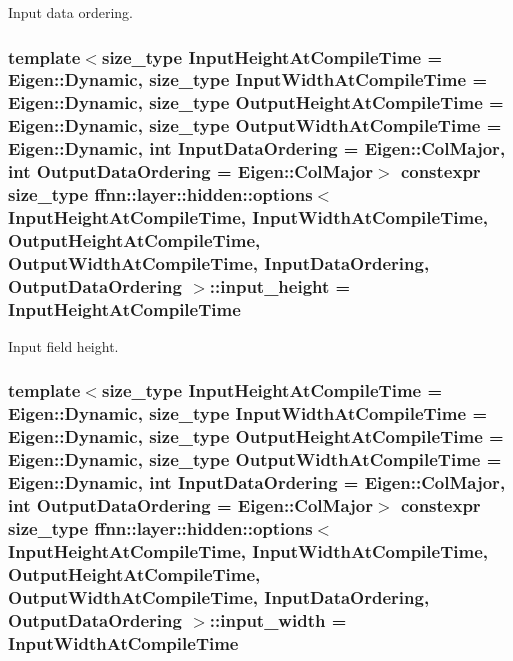 Input data ordering. 

\hypertarget{structffnn_1_1layer_1_1hidden_1_1options_ac51716b775a79ff9f7855a146e8bf0c3}{
\subsubsection[{input\-\_\-height}]{\setlength{\rightskip}{0pt plus 5cm}template$<$size\-\_\-type Input\-Height\-At\-Compile\-Time = Eigen\-::\-Dynamic, size\-\_\-type Input\-Width\-At\-Compile\-Time = Eigen\-::\-Dynamic, size\-\_\-type Output\-Height\-At\-Compile\-Time = Eigen\-::\-Dynamic, size\-\_\-type Output\-Width\-At\-Compile\-Time = Eigen\-::\-Dynamic, int Input\-Data\-Ordering = Eigen\-::\-Col\-Major, int Output\-Data\-Ordering = Eigen\-::\-Col\-Major$>$ constexpr {\bf size\-\_\-type} {\bf ffnn\-::layer\-::hidden\-::options}$<$ Input\-Height\-At\-Compile\-Time, Input\-Width\-At\-Compile\-Time, Output\-Height\-At\-Compile\-Time, Output\-Width\-At\-Compile\-Time, Input\-Data\-Ordering, Output\-Data\-Ordering $>$\-::input\-\_\-height = Input\-Height\-At\-Compile\-Time\hspace{0.3cm}{\ttfamily [static]}}}\label{structffnn_1_1layer_1_1hidden_1_1options_ac51716b775a79ff9f7855a146e8bf0c3}


Input field height. 

\hypertarget{structffnn_1_1layer_1_1hidden_1_1options_a4567b834d82f7f709d014809b34ec8c4}{
\subsubsection[{input\-\_\-width}]{\setlength{\rightskip}{0pt plus 5cm}template$<$size\-\_\-type Input\-Height\-At\-Compile\-Time = Eigen\-::\-Dynamic, size\-\_\-type Input\-Width\-At\-Compile\-Time = Eigen\-::\-Dynamic, size\-\_\-type Output\-Height\-At\-Compile\-Time = Eigen\-::\-Dynamic, size\-\_\-type Output\-Width\-At\-Compile\-Time = Eigen\-::\-Dynamic, int Input\-Data\-Ordering = Eigen\-::\-Col\-Major, int Output\-Data\-Ordering = Eigen\-::\-Col\-Major$>$ constexpr {\bf size\-\_\-type} {\bf ffnn\-::layer\-::hidden\-::options}$<$ Input\-Height\-At\-Compile\-Time, Input\-Width\-At\-Compile\-Time, Output\-Height\-At\-Compile\-Time, Output\-Width\-At\-Compile\-Time, Input\-Data\-Ordering, Output\-Data\-Ordering $>$\-::input\-\_\-width = Input\-Width\-At\-Compile\-Time\hspace{0.3cm}{\ttfamily [static]}}}\label{structffnn_1_1layer_1_1hidden_1_1options_a4567b834d82f7f709d014809b34ec8c4}


